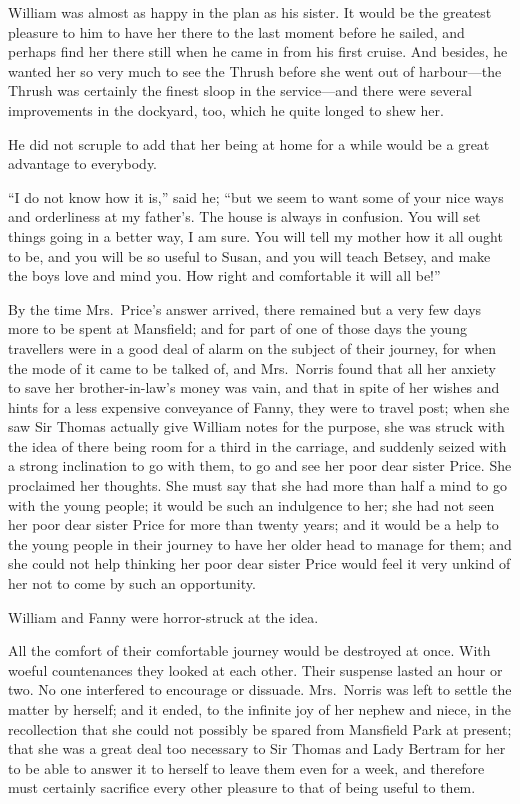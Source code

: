 William was almost as happy in the plan as his sister.
It would be the greatest pleasure to him to have her there
to the last moment before he sailed, and perhaps find
her there still when he came in from his first cruise.
And besides, he wanted her so very much to see the Thrush
before she went out of harbour---the Thrush was certainly
the finest sloop in the service---and there were several
improvements in the dockyard, too, which he quite longed to
shew her.

He did not scruple to add that her being at home
for a while would be a great advantage to everybody.

``I do not know how it is,'' said he; ``but we seem to want
some of your nice ways and orderliness at my father's. The
house is always in confusion.  You will set things going
in a better way, I am sure.  You will tell my mother how it
all ought to be, and you will be so useful to Susan, and you
will teach Betsey, and make the boys love and mind you.
How right and comfortable it will all be!''

By the time Mrs.\ Price's answer arrived, there remained
but a very few days more to be spent at Mansfield;
and for part of one of those days the young travellers
were in a good deal of alarm on the subject of their
journey, for when the mode of it came to be talked of,
and Mrs.\ Norris found that all her anxiety to save her
brother-in-law's money was vain, and that in spite of her
wishes and hints for a less expensive conveyance of Fanny,
they were to travel post; when she saw Sir Thomas actually
give William notes for the purpose, she was struck with
the idea of there being room for a third in the carriage,
and suddenly seized with a strong inclination to go
with them, to go and see her poor dear sister Price.
She proclaimed her thoughts.  She must say that she
had more than half a mind to go with the young people;
it would be such an indulgence to her; she had not seen
her poor dear sister Price for more than twenty years;
and it would be a help to the young people in their journey
to have her older head to manage for them; and she could
not help thinking her poor dear sister Price would feel it
very unkind of her not to come by such an opportunity.

William and Fanny were horror-struck at the idea.

All the comfort of their comfortable journey would
be destroyed at once.  With woeful countenances they
looked at each other.  Their suspense lasted an hour
or two.  No one interfered to encourage or dissuade.
Mrs.\ Norris was left to settle the matter by herself;
and it ended, to the infinite joy of her nephew and niece,
in the recollection that she could not possibly be spared
from Mansfield Park at present; that she was a great deal
too necessary to Sir Thomas and Lady Bertram for her to be
able to answer it to herself to leave them even for a week,
and therefore must certainly sacrifice every other pleasure
to that of being useful to them.

